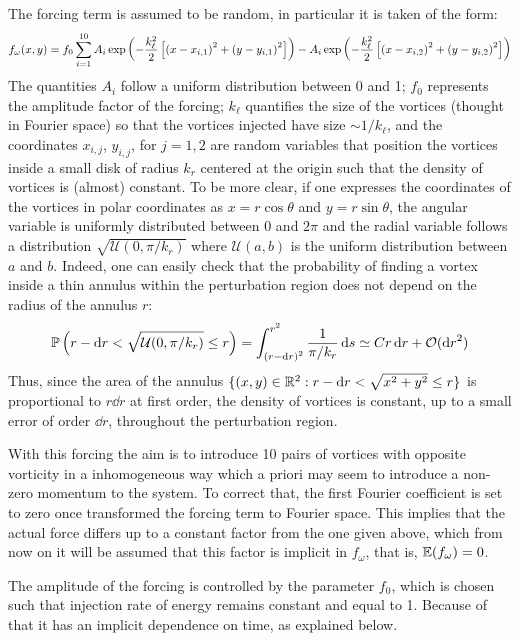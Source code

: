 \documentclass[../main.tex]{subfiles}
\begin{document}
The forcing term is assumed to be random, in particular it is taken of the form:
\begin{equation}
	f_\omega(x,y) = f_0\sum_{i=1}^{10} A_i \operatorname{exp}\left(-\frac{k_\ell^2}{2}\left[{(x-x_{i,1})}^2 + {(y-y_{i,1})}^2\right]\right) - A_i\operatorname{exp}\left(-\frac{k_\ell^2}{2}\left[{(x-x_{i,2})}^2 + {(y-y_{i,2})}^2\right]\right)
\end{equation}
The quantities $A_i$ follow a uniform distribution between 0 and 1; $f_0$ represents the amplitude factor of the forcing; $k_\ell$ quantifies the size of the vortices (thought in Fourier space) so that the vortices injected have size $\sim 1/k_\ell$, and the coordinates $x_{i,j}$, $y_{i,j}$, for $j=1,2$ are random variables that position the vortices inside a small disk of radius $k_r$ centered at the origin such that the density of vortices is (almost) constant. To be more clear, if one expresses the coordinates of the vortices in polar coordinates as $x=r\cos\theta$ and $y=r\sin\theta$, the angular variable is uniformly distributed between 0 and $2\pi$ and the radial variable follows a distribution $\sqrt{\mathcal{U}(0,\pi/k_r)}$ where $\mathcal{U}(a,b)$ is the uniform distribution between $a$ and $b$. Indeed, one can easily check that the probability of finding a vortex inside a thin annulus within the perturbation region does not depend on the radius of the annulus $r$:
\begin{equation}
	\mathbb{P}\left(r-\dd{r} < \sqrt{\mathcal{U}(0,\pi/k_r)} \leq r\right) = \int_{{(r-\dd{r})}^2}^{r^2} \frac{1}{\pi/k_r} \dd{s} \simeq C r \dd{r} + \mathcal{O}(\dd{r}^2)
\end{equation}
Thus, since the area of the annulus $\{(x,y) \in \mathbb{R}^2 : r-\dd{r} < \sqrt{x^2+y^2} \leq r\}$ is proportional to $r \dd{r}$ at first order, the density of vortices is constant, up to a small error of order $\dd{r}$, throughout the perturbation region.

With this forcing the aim is to introduce 10 pairs of vortices with opposite vorticity in a inhomogeneous way which a priori may seem to introduce a non-zero momentum to the system. To correct that, the first Fourier coefficient is set to zero once transformed the forcing term to Fourier space. This implies that the actual force differs up to a constant factor from the one given above, which from now on it will be assumed that this factor is implicit in $f_\omega$, that is, $\mathbb{E}(f_\omega) = 0$.

The amplitude of the forcing is controlled by the parameter $f_0$, which is chosen such that injection rate of energy remains constant and equal to 1. Because of that it has an implicit dependence on time, as explained below.
\end{document}
